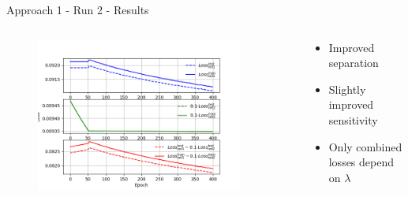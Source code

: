 \begin{frame}{Approach 1 - Run 2 - Results}
\begin{figure}[htbp]
    \end{figure}
    \vspace{-0.9cm}
    \begin{columns}
    \begin{column}{0.5\textwidth}
    \begin{figure}
            \includegraphics[width=0.9\textwidth]{app1/half_classic_losses.png}
    \end{figure}
    \end{column}
    \begin{column}{0.5\textwidth}
    \begin{itemize}
        \item Improved separation
        \item Slightly improved sensitivity
        \item Only combined losses depend on $\lambda$
    \end{itemize}
    \end{column}
    \end{columns}
\end{frame}

